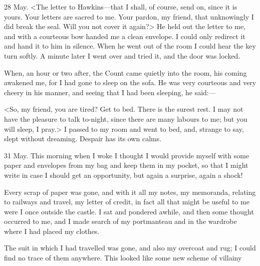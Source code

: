 \begin{diary}{28 May.}
<The letter to Hawkins—that I shall, of course, send on, since it is yours. Your letters are sacred to me. Your pardon, my friend, that unknowingly I did break the seal. Will you not cover it again?> He held out the letter to me, and with a courteous bow handed me a clean envelope. I could only redirect it and hand it to him in silence. When he went out of the room I could hear the key turn softly. A minute later I went over and tried it, and the door was locked.

When, an hour or two after, the Count came quietly into the room, his coming awakened me, for I had gone to sleep on the sofa. He was very courteous and very cheery in his manner, and seeing that I had been sleeping, he said:—

<So, my friend, you are tired? Get to bed. There is the surest rest. I may not have the pleasure to talk to-night, since there are many labours to me; but you will sleep, I pray.> I passed to my room and went to bed, and, strange to say, slept without dreaming. Despair has its own calms.
\end{diary}
 
\begin{diary}{31 May.}
This morning when I woke I thought I would provide myself with some paper and envelopes from my bag and keep them in my pocket, so that I might write in case I should get an opportunity, but again a surprise, again a shock!

Every scrap of paper was gone, and with it all my notes, my memoranda, relating to railways and travel, my letter of credit, in fact all that might be useful to me were I once outside the castle. I sat and pondered awhile, and then some thought occurred to me, and I made search of my portmanteau and in the wardrobe where I had placed my clothes.

The suit in which I had travelled was gone, and also my overcoat and rug; I could find no trace of them anywhere. This looked like some new scheme of villainy
\end{diary}
 
